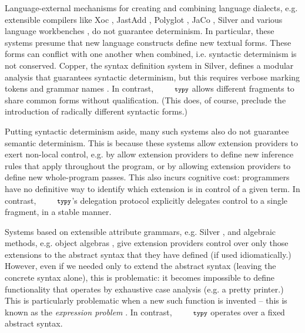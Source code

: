 \documentclass[10pt]{sigplanconf}
\newcommand{\typy}{\texttt{\footnotesize typy}}
\begin{document}



Language-external mechanisms for creating and combining language dialects, e.g. extensible compilers like Xoc \cite{conf/asplos/CoxBCKK08}, JastAdd \cite{Ekman:2007:JEJ:1297027.1297029}, Polyglot \cite{Nystrom-Clarkson-Myers03}, JaCo \cite{zenger2001implementing}, Silver \cite{VanWyk:2010:SEA} and various language workbenches \cite{erdweg2013state}, do not guarantee determinism. In particular, these systems presume that new language constructs define new textual forms. These forms can conflict with one another when combined, i.e. syntactic determinism is not conserved. Copper, the syntax definition system in Silver, defines a modular analysis that guarantees syntactic determinism, but this requires verbose marking tokens and grammar names \cite{conf/pldi/SchwerdfegerW09}. In contrast, $\typy$ allows  different fragments to share common forms without qualification. (This does, of course, preclude the introduction of radically different syntactic forms.)

Putting syntactic determinism aside, many such systems also do not guarantee semantic determinism. This is because these systems allow extension providers to exert non-local control, e.g. by allow extension providers to define new inference rules that apply throughout the program, or by allowing extension providers to define new whole-program passes. This also incurs cognitive cost: programmers have no definitive way to identify which extension is in control of a given term. In contrast, $\typy$'s delegation protocol explicitly delegates control to a single fragment, in a stable manner.

Systems based on extensible attribute grammars, e.g. Silver \cite{VanWyk:2010:SEA}, and algebraic methods, e.g. object algebras \cite{oliveira2012extensibility}, give extension providers control over only those extensions to the abstract syntax that they have defined (if used idiomatically.) However, even if we needed only to extend the abstract syntax (leaving the concrete syntax alone), this is problematic: it becomes impossible to define functionality that operates by exhaustive case analysis (e.g. a pretty printer.) This is particularly problematic when a new such function is invented -- this is known as the \emph{expression problem} \cite{wadler1998expression,Reynolds75}. In contrast, $\typy$ operates over a fixed abstract syntax.
\end{document}
